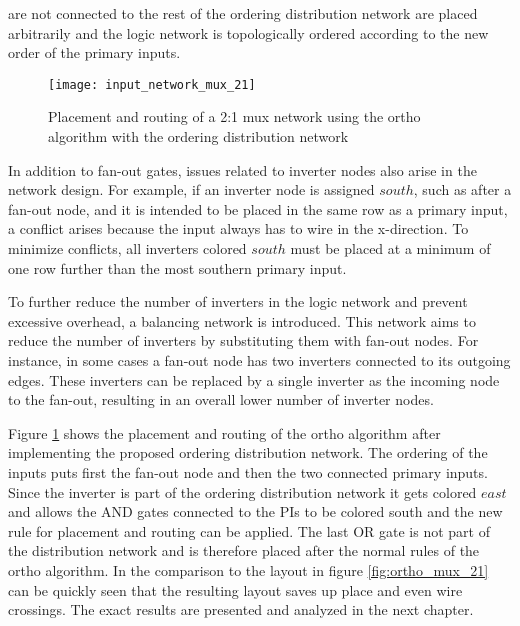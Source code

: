 are not connected to the rest of the ordering distribution network are placed arbitrarily and the logic network is topologically ordered according to the new order of the primary inputs.


\begin{figure}
	\centering
	\texttt{[image: input\_network\_mux\_21]}
	\caption{Placement and routing of a 2:1 mux network using the ortho algorithm with the ordering distribution network}\label{fig:input_network_mux_21}
\end{figure}

In addition to fan-out gates, issues related to inverter nodes also arise in the network design. For example, if an inverter node is assigned $south$, such as after a fan-out node, and it is intended to be placed in the same row as a primary input, a conflict arises because the input always has to wire in the x-direction. To minimize conflicts, all inverters colored $south$ must be placed at a minimum of one row further than the most southern primary input.

To further reduce the number of inverters in the logic network and prevent excessive overhead, a balancing network is introduced. This network aims to reduce the number of inverters by substituting them with fan-out nodes. For instance, in some cases a fan-out node has two inverters connected to its outgoing edges. These inverters can be replaced by a single inverter as the incoming node to the fan-out, resulting in an overall lower number of inverter nodes.

Figure \ref{fig:input_network_mux_21} shows the placement and routing of the ortho algorithm after implementing the proposed ordering distribution network. The ordering of the inputs puts first the fan-out node and then the two connected primary inputs. Since the inverter is part of the ordering distribution network it gets colored $east$ and allows the AND gates connected to the PIs to be colored south and the new rule for placement and routing can be applied. The last OR gate is not part of the distribution network and is therefore placed after the normal rules of the ortho algorithm. In the comparison to the layout in figure \ref{fig:ortho_mux_21} can be quickly seen that the resulting layout saves up place and even wire crossings. The exact results are presented and analyzed in the next chapter.

